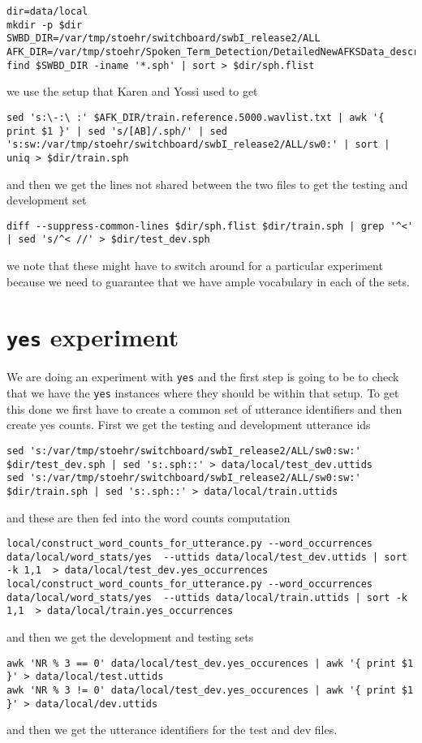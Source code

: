 \documentclass{article}
\begin{document}
\begin{verbatim}
dir=data/local
mkdir -p $dir
SWBD_DIR=/var/tmp/stoehr/switchboard/swbI_release2/ALL
AFK_DIR=/var/tmp/stoehr/Spoken_Term_Detection/DetailedNewAFKSData_description
find $SWBD_DIR -iname '*.sph' | sort > $dir/sph.flist
\end{verbatim}
we use the setup that Karen and Yossi used to get
\begin{verbatim}
sed 's:\-:\ :' $AFK_DIR/train.reference.5000.wavlist.txt | awk '{ print $1 }' | sed 's/[AB]/.sph/' | sed 's:sw:/var/tmp/stoehr/switchboard/swbI_release2/ALL/sw0:' | sort | uniq > $dir/train.sph
\end{verbatim}
and then we get the lines not shared between the two files to get the
testing and development set
\begin{verbatim}
diff --suppress-common-lines $dir/sph.flist $dir/train.sph | grep '^<' | sed 's/^< //' > $dir/test_dev.sph
\end{verbatim}
we note that these might have to switch around for a particular
experiment because we need to guarantee that we have ample
vocabulary in each of the sets.

\section{\texttt{yes} experiment}

We are doing an experiment with \texttt{yes}
and the first step is going to be to check that we have
the \texttt{yes} instances where they should be within
that setup.  To get this done we first have to create a common set
of utterance identifiers and then create yes counts.
First we get the testing and development utterance ids
\begin{verbatim}
sed 's:/var/tmp/stoehr/switchboard/swbI_release2/ALL/sw0:sw:' $dir/test_dev.sph | sed 's:.sph::' > data/local/test_dev.uttids
sed 's:/var/tmp/stoehr/switchboard/swbI_release2/ALL/sw0:sw:' $dir/train.sph | sed 's:.sph::' > data/local/train.uttids
\end{verbatim}
and these are then fed into the word counts computation
\begin{verbatim}
local/construct_word_counts_for_utterance.py --word_occurrences data/local/word_stats/yes  --uttids data/local/test_dev.uttids | sort -k 1,1  > data/local/test_dev.yes_occurrences
local/construct_word_counts_for_utterance.py --word_occurrences data/local/word_stats/yes  --uttids data/local/train.uttids | sort -k 1,1  > data/local/train.yes_occurrences
\end{verbatim}
and then we get the development and testing sets
\begin{verbatim}
awk 'NR % 3 == 0' data/local/test_dev.yes_occurences | awk '{ print $1 }' > data/local/test.uttids
awk 'NR % 3 != 0' data/local/test_dev.yes_occurences | awk '{ print $1 }' > data/local/dev.uttids
\end{verbatim}
and then we get the utterance identifiers for the test and dev files.
\end{document}
